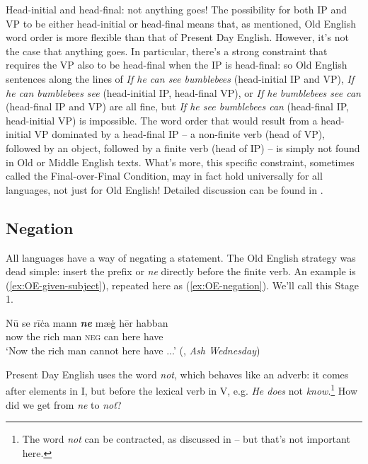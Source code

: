 \begin{syntaxbox}{Head-initial and head-final: not anything goes!}
The possibility for both IP and VP to be either head-initial or head-final means that, as mentioned, Old English word order is more flexible than that of Present Day English. However, it's not the case that anything goes. In particular, there's a strong constraint that requires the VP also to be head-final when the IP is head-final: so Old English sentences along the lines of \emph{If he can see bumblebees} (head-initial IP and VP), \emph{If he can bumblebees see} (head-initial IP, head-final VP), or \emph{If he bumblebees see can} (head-final IP and VP) are all fine, but \emph{If he see bumblebees can} (head-final IP, head-initial VP) is impossible. The word order that would result from a head-initial VP dominated by a head-final IP -- a non-finite verb (head of VP), followed by an object, followed by a finite verb (head of IP) -- is simply not found in Old or Middle English texts. What's more, this specific constraint, sometimes called the Final-over-Final Condition, may in fact hold universally for all languages, not just for Old English! Detailed discussion can be found in \citet{SheehanBiberauerRobertsHolmberg2017}.
\end{syntaxbox}


\subsection{Negation}\label{OE-negation}
\largerpage
All languages have a way of negating a statement. The Old English strategy was dead simple: insert the prefix or 
\emph{ne} directly before the finite verb. An example is (\ref{ex:OE-given-subject}), repeated here as (\ref{ex:OE-negation}). We'll call this Stage 1.

\begin{exe}
    \ex\label{ex:OE-negation}
    \gll Nū se rīċa mann \emph{\textbf{ne}} mæġ hēr habban\\
    now the rich man \textsc{neg} can here have\\
    \trans `Now the rich man cannot here have ...' \hfill (, \emph{Ash Wednesday})
\end{exe}

\noindent Present Day English uses the word \emph{not}, which behaves like an adverb: it comes after elements in I, but before the lexical verb in V, e.g. \emph{He does} not \emph{know}.\footnote{The word \emph{not} can be contracted, as discussed in  -- but that's not important here.} How did we get from \emph{ne} to \emph{not}?

